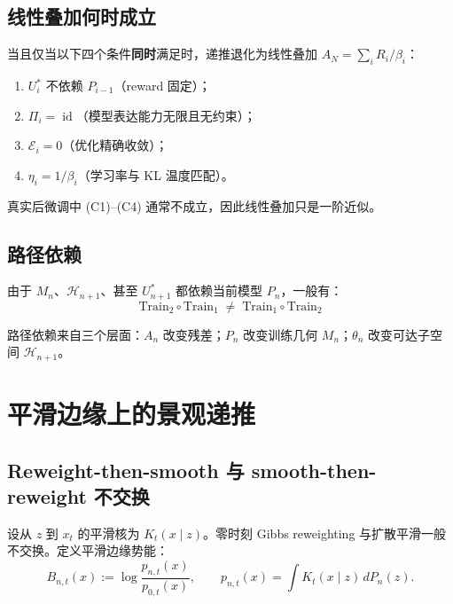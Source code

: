 \documentclass[11pt,a4paper]{article}
\DeclareMathOperator{\id}{id}
\newcommand{\cH}{\mathcal{H}}
\newcommand{\cE}{\mathcal{E}}
\newcommand{\ProjectOp}{\Pi}
\begin{document}
\subsection{线性叠加何时成立}

当且仅当以下四个条件\textbf{同时}满足时，递推退化为线性叠加 $A_N = \sum_i R_i/\beta_i$：
\begin{enumerate}[label=(C\arabic*),nosep]
\item $U_i^*$ 不依赖 $P_{i-1}$（reward 固定）；
\item $\ProjectOp_i = \id$（模型表达能力无限且无约束）；
\item $\cE_i = 0$（优化精确收敛）；
\item $\eta_i = 1/\beta_i$（学习率与 KL 温度匹配）。
\end{enumerate}

真实后微调中 (C1)--(C4) 通常不成立，因此线性叠加只是一阶近似。

\subsection{路径依赖}

由于 $M_n$、$\cH_{n+1}$、甚至 $U_{n+1}^*$ 都依赖当前模型 $P_n$，一般有：
\begin{equation}\label{eq:noncommute}
\boxed{
\text{Train}_2 \circ \text{Train}_1 \;\neq\; \text{Train}_1 \circ \text{Train}_2
}
\end{equation}

路径依赖来自三个层面：$A_n$ 改变残差；$P_n$ 改变训练几何 $M_n$；$\theta_n$ 改变可达子空间 $\cH_{n+1}$。

\section{平滑边缘上的景观递推}
\label{sec:landscape}

\subsection{Reweight-then-smooth 与 smooth-then-reweight 不交换}

设从 $z$ 到 $x_t$ 的平滑核为 $K_t(x\mid z)$。零时刻 Gibbs reweighting 与扩散平滑一般不交换。定义平滑边缘势能：
\begin{equation}\label{eq:Bt}
B_{n,t}(x) := \log\frac{p_{n,t}(x)}{p_{0,t}(x)},\qquad p_{n,t}(x) = \int K_t(x\mid z)\,dP_n(z).
\end{equation}
\end{document}
